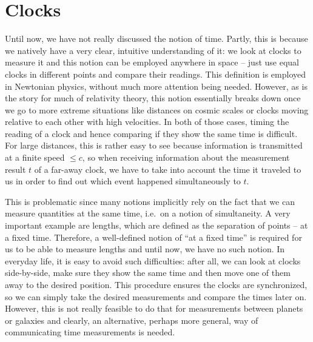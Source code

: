 \documentclass[../relativity_main.tex]{subfiles}
\begin{document}
	\section{Clocks}\label{sec:clocks}
Until now, we have not really discussed the notion of time. Partly, this is because we natively have a very clear, intuitive understanding of it: we look at clocks to measure it and this notion can be employed anywhere in space -- just use equal clocks in different points and compare their readings. This definition is employed in Newtonian physics, without much more attention being needed. However, as is the story for much of relativity theory, this notion essentially breaks down once we go to more extreme situations like distances on cosmic scales or clocks moving relative to each other with high velocities. In both of those cases, timing the reading of a clock and hence comparing if they show the same time is difficult. For large distances, this is rather easy to see because information is transmitted at a finite speed $\leq c$, so when receiving information about the measurement result $t$ of a far-away clock, we have to take into account the time it traveled to us in order to find out which event happened simultaneously to $t$.

This is problematic since many notions implicitly rely on the fact that we can measure quantities at the same time, i.e.~on a notion of simultaneity. A very important example are lengths, which are defined as the separation of points -- at a fixed time. Therefore, a well-defined notion of \enquote{at a fixed time} is required for us to be able to measure lengths and until now, we have no such notion. In everyday life, it is easy to avoid such difficulties: after all, we can look at clocks side-by-side, make sure they show the same time and then move one of them away to the desired position. This procedure ensures the clocks are synchronized, so we can simply take the desired measurements and compare the times later on. However, this is not really feasible to do that for measurements between planets or galaxies and clearly, an alternative, perhaps more general, way of communicating time measurements is needed.
\end{document}
